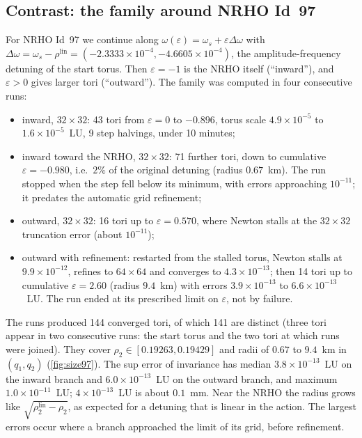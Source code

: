 \documentclass[11pt]{article}
\begin{document}
\subsection{Contrast: the family around NRHO Id~97}\label{sec:id97}
For NRHO Id~97 we continue along $\omega(\varepsilon) = \omega_s + \varepsilon\Delta\omega$ with
$\Delta\omega = \omega_s - \rho^{\mathrm{lin}} = (-2.3333\times10^{-4},-4.6605\times10^{-4})$, the
amplitude-frequency detuning of the start torus. Then $\varepsilon=-1$ is the NRHO itself
(``inward''), and $\varepsilon>0$ gives larger tori (``outward''). The family was computed in four
consecutive runs:
\begin{itemize}
\item inward, $32\times32$: 43 tori from $\varepsilon=0$ to $-0.896$, torus scale $4.9\times10^{-5}$
  to $1.6\times10^{-5}$~LU, 9 step halvings, under 10 minutes;
\item inward toward the NRHO, $32\times32$: 71 further tori, down to cumulative
  $\varepsilon=-0.980$, i.e.\ $2\%$ of the original detuning (radius $0.67$~km). The run stopped
  when the step fell below its minimum, with errors approaching $10^{-11}$; it predates the
  automatic grid refinement;
\item outward, $32\times32$: 16 tori up to $\varepsilon = 0.570$, where Newton stalls at the
  $32\times32$ truncation error (about $10^{-11}$);
\item outward with refinement: restarted from the stalled torus, Newton stalls at
  $9.9\times10^{-12}$, refines to $64\times64$ and converges to $4.3\times10^{-13}$; then 14 tori
  up to cumulative $\varepsilon=2.60$ (radius $9.4$~km) with errors $3.9\times10^{-13}$ to
  $6.6\times10^{-13}$~LU. The run ended at its prescribed limit on $\varepsilon$, not by failure.
\end{itemize}
The runs produced 144 converged tori, of which 141 are distinct (three tori appear in two
consecutive runs: the start torus and the two tori at which runs were joined). They cover
$\rho_2\in[0.19263, 0.19429]$ and radii of $0.67$ to $9.4$~km in $(q_1,q_2)$
(\cref{fig:size97}). The sup error of invariance has median $3.8\times10^{-13}$~LU on the
inward branch and $6.0\times10^{-13}$~LU on the outward branch, and maximum $1.0\times10^{-11}$~LU;
$4\times10^{-13}$~LU is about $0.1$~mm. Near the NRHO the radius grows like
$\sqrt{\rho^{\mathrm{lin}}_2-\rho_2}$, as expected for a detuning that is linear in the action.
The largest errors occur where a branch approached the limit of its grid, before refinement.
\end{document}
